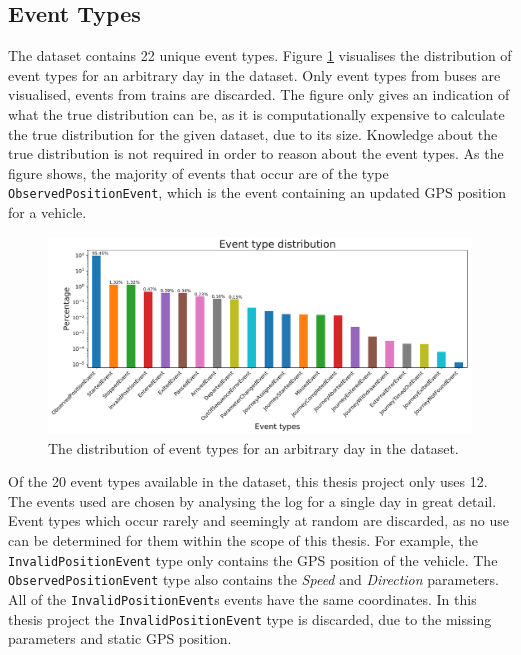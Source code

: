 \subsection{Event Types}
The dataset contains 22 unique event types.
Figure \ref{fig:types-barplot} visualises the distribution of event types for an arbitrary day in the dataset.
Only event types from buses are visualised, events from trains are discarded.
The figure only gives an indication of what the true distribution can be, as it is computationally expensive to calculate the true distribution for the given dataset, due to its size.
Knowledge about the true distribution is not required in order to reason about the event types.
As the figure shows, the majority of events that occur are of the type \texttt{ObservedPositionEvent}, which is the event containing an updated GPS position for a vehicle.

\begin{figure}[t!]
    \centering
    \includegraphics[width=\textwidth]{figures/types_barplot}
    \caption[The distribution of event types for an arbitrary day in the dataset]
    {\small The distribution of event types for an arbitrary day in the dataset.}
    \label{fig:types-barplot}
\end{figure}

Of the 20 event types available in the dataset, this thesis project only uses 12.
The events used are chosen by analysing the log for a single day in great detail.
Event types which occur rarely and seemingly at random are discarded, as no use can be determined for them within the scope of this thesis.
For example, the \texttt{InvalidPositionEvent} type only contains the GPS position of the vehicle.
The \texttt{ObservedPositionEvent} type also contains the \textit{Speed} and \textit{Direction} parameters.
All of the \texttt{InvalidPositionEvent}s events have the same coordinates.
In this thesis project the \texttt{InvalidPositionEvent} type is discarded, due to the missing parameters and static GPS position.

